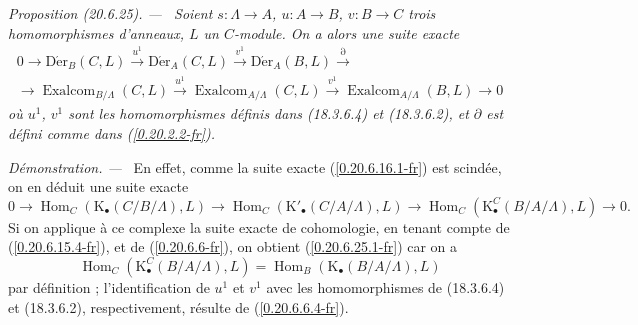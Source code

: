 \documentclass[10pt,oneside]{book}
\makeatletter
\newcommand{\sref}[1]{(\ref{#1})}
\newcommand{\setmanualcurrentlabel}[1]{\def\@currentlabel{#1}}
\newenvironment{proposition}[1][]{%
  \setmanualcurrentlabel{#1}\par\medskip\noindent\itshape Proposition (#1). ---\ }{\par}
\newenvironment{proof}{%
  \par\medskip\noindent\textit{Démonstration. ---\ }}{\par}
\makeatother
\begin{document}
\begin{proposition}[20.6.25]
\label{0.20.6.25-fr}
Soient $s:\Lambda\to A$, $u:A\to B$, $v:B\to C$ trois homomorphismes
d'anneaux, $L$ un $C$-module. On a alors une suite exacte
\begin{equation}
\tag{20.6.25.1}
\label{0.20.6.25.1-fr}
\begin{split}
  0\to\operatorname{D\acute{e}r}_B(C,L)\xrightarrow{u^1}
  \operatorname{D\acute{e}r}_A(C,L)\xrightarrow{v^1}
  \operatorname{D\acute{e}r}_A(B,L)\xrightarrow{\partial} \\
  \to\operatorname{Exalcom}_{B/\Lambda}(C,L)\xrightarrow{u^1}
  \operatorname{Exalcom}_{A/\Lambda}(C,L)\xrightarrow{v^1}
  \operatorname{Exalcom}_{A/\Lambda}(B,L)\to0
\end{split}
\end{equation}
où $u^1$, $v^1$ sont les homomorphismes définis dans (18.3.6.4) et
(18.3.6.2), et $\partial$ est défini comme dans \sref{0.20.2.2-fr}.
\end{proposition}

\begin{proof}
En effet, comme la suite exacte \sref{0.20.6.16.1-fr} est scindée, on en
déduit une suite exacte
\[
  0\to\operatorname{Hom}_C(\mathrm{K}_\bullet(C/B/\Lambda),L)\to
  \operatorname{Hom}_C(\mathrm{K}'_\bullet(C/A/\Lambda),L)\to
  \operatorname{Hom}_C(\mathrm{K}^C_\bullet(B/A/\Lambda),L)\to0.
\]
Si on applique à ce complexe la suite exacte de cohomologie, en tenant compte
de \sref{0.20.6.15.4-fr}, et de \sref{0.20.6.6-fr}, on obtient
\sref{0.20.6.25.1-fr} car on a
\[
  \operatorname{Hom}_C(\mathrm{K}^C_\bullet(B/A/\Lambda),L)
  =\operatorname{Hom}_B(\mathrm{K}_\bullet(B/A/\Lambda),L)
\]
par définition ; l'identification de $u^1$ et $v^1$ avec les homomorphismes
de (18.3.6.4) et (18.3.6.2), respectivement, résulte de \sref{0.20.6.6.4-fr}.
\end{proof}
\end{document}
